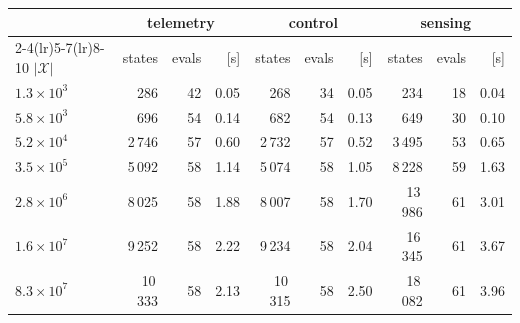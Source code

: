 \scriptsize
\setlength{\tabcolsep}{3.5pt}
\begin{tabular}{lrrrrrrrrr}
\toprule
& \multicolumn{3}{c}{telemetry} & \multicolumn{3}{c}{control} & \multicolumn{3}{c}{sensing} \\
\cmidrule(lr){2-4}\cmidrule(lr){5-7}\cmidrule(lr){8-10}
$|\mathcal{X}|$ & states & evals & [s] & states & evals & [s] & states & evals & [s] \\
\midrule
${1.3\times 10^{3}}$ & 286 & 42 & 0.05 & 268 & 34 & 0.05 & 234 & 18 & 0.04 \\
${5.8\times 10^{3}}$ & 696 & 54 & 0.14 & 682 & 54 & 0.13 & 649 & 30 & 0.10 \\
${5.2\times 10^{4}}$ & 2\,746 & 57 & 0.60 & 2\,732 & 57 & 0.52 & 3\,495 & 53 & 0.65 \\
${3.5\times 10^{5}}$ & 5\,092 & 58 & 1.14 & 5\,074 & 58 & 1.05 & 8\,228 & 59 & 1.63 \\
${2.8\times 10^{6}}$ & 8\,025 & 58 & 1.88 & 8\,007 & 58 & 1.70 & 13\,986 & 61 & 3.01 \\
${1.6\times 10^{7}}$ & 9\,252 & 58 & 2.22 & 9\,234 & 58 & 2.04 & 16\,345 & 61 & 3.67 \\
${8.3\times 10^{7}}$ & 10\,333 & 58 & 2.13 & 10\,315 & 58 & 2.50 & 18\,082 & 61 & 3.96 \\
\bottomrule
\end{tabular}
